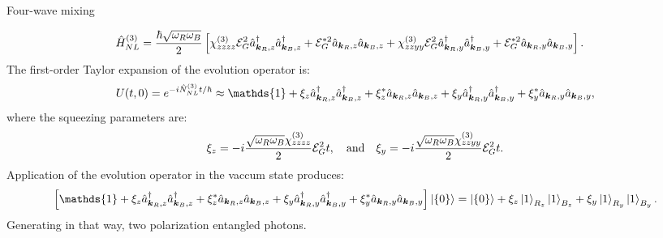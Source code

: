 \begin{example}{Four-wave mixing}
\begin{enumerate}[itemsep=0pt,topsep=0pt,parsep=0pt,label=\alph*)]
\begin{align*}
    \hat{H}_{NL}^{(3)}&=\frac{\hbar\sqrt{\omega_R\omega_B}}{2}\left[\chi_{zzzz}^{(3)}\mathcal{E}_G^2\hat{a}^\dagger_{\bm{k}_R,z}\hat{a}^\dagger_{\bm{k}_B,z}+\mathcal{E}^{*2}_G\hat{a}_{\bm{k}_R,z}\hat{a}_{\bm{k}_B,z}+
    \chi_{zzyy}^{(3)}\mathcal{E}_G^2\hat{a}^\dagger_{\bm{k}_R,y}\hat{a}^\dagger_{\bm{k}_B,y}+\mathcal{E}^{*2}_G\hat{a}_{\bm{k}_R,y}\hat{a}_{\bm{k}_B,y}\right].
  \end{align*}
  The first-order Taylor expansion of the evolution operator is:
  \begin{align*}
    U(t,0)=e^{-i\hN_{NL}^{(3)}t/\hbar}\approx\mathds{1}+\xi_z\ha^\dagger_{\bk_R,z}\ha^\dagger_{\bk_B,z}+\xi^*_z\ha_{\bk_R,z}\ha_{\bk_B,z}+\xi_y\ha^\dagger_{\bk_R,y}\ha^\dagger_{\bk_B,y}+\xi^*_y\ha_{\bk_R,y}\ha_{\bk_B,y},
  \end{align*}
  where the squeezing parameters are:
  \begin{align*}
    \xi_z=-i\frac{\sqrt{\omega_R\omega_B}\chi_{zzzz}^{(3)}}{2}\mathcal{E}_G^2t,\quad\text{and}\quad\xi_y=-i\frac{\sqrt{\omega_R\omega_B}\chi_{zzyy}^{(3)}}{2}\mathcal{E}_G^2t.
  \end{align*}
  Application of the evolution operator in the vaccum state produces:
  {\small
  \begin{align*}
    \left[\mathds{1}+\xi_z\ha^\dagger_{\bk_R,z}\ha^\dagger_{\bk_B,z}+\xi^*_z\ha_{\bk_R,z}\ha_{\bk_B,z}+\xi_y\ha^\dagger_{\bk_R,y}\ha^\dagger_{\bk_B,y}+\xi^*_y\ha_{\bk_R,y}\ha_{\bk_B,y}\right]\ket{\{0\}}=\ket{\{0\}}+\xi_z\ket{1}_{R_z}\ket{1}_{B_z}+\xi_y\ket{1}_{R_y}\ket{1}_{B_y}.
  \end{align*}}
  Generating in that way, two polarization entangled photons.
\end{enumerate}
\end{example}

